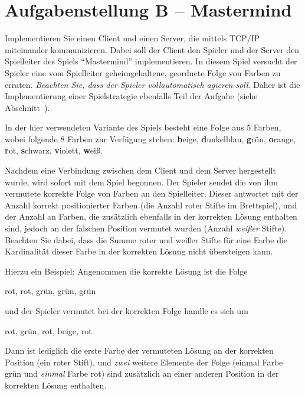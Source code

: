 

\usepackage{bytefield}

\newcommand{\baselinecenterit}[1]{%
  \centering
  \raisebox{0pt}[\heightof{W}][0pt]{\itshape #1}%
}




\section*{Aufgabenstellung B -- Mastermind}\label{sec:aufgabenstellung}
Implementieren Sie einen Client und einen Server, die mittels TCP/IP
miteinander kommunizieren. Dabei soll der Client den Spieler und der Server den
Spielleiter des Spiels ``Mastermind'' implementieren. In diesem Spiel versucht
der Spieler eine vom Spielleiter geheimgehaltene, geordnete Folge von Farben zu
erraten. \emph{Beachten Sie, dass der Spieler vollautomatisch agieren soll}. Daher
ist die Implementierung einer Spielstrategie ebenfalls Teil der Aufgabe
(siehe Abschnitt~).

In der hier verwendeten Variante des Spiels besteht eine Folge aus 5 Farben,
wobei folgende 8 Farben zur Verfügung stehen:
\textbf{b}eige,
\textbf{d}unkelblau,
\textbf{g}rün,
\textbf{o}range,
\textbf{r}ot,
\textbf{s}chwarz,
\textbf{v}iolett,
\textbf{w}eiß.

Nachdem eine Verbindung zwischen dem Client und dem Server hergestellt wurde,
wird sofort mit dem Spiel begonnen. Der Spieler sendet die von ihm vermutete
korrekte Folge von Farben an den Spielleiter. Dieser antwortet mit der Anzahl
korrekt positionierter Farben (die Anzahl roter Stifte im Brettspiel), und der
Anzahl an Farben, die zusätzlich ebenfalls in der korrekten Lösung enthalten
sind, jedoch an der falschen Position vermutet wurden (Anzahl \emph{weißer}
Stifte). Beachten Sie dabei, dass die Summe roter und weißer Stifte für eine
Farbe die Kardinalität dieser Farbe in der korrekten Lösung nicht übersteigen
kann.

Hierzu ein Beispiel: Angenommen die korrekte Lösung ist die Folge
\begin{osuefmtcode}
  rot, rot, grün, grün, grün
\end{osuefmtcode}
und der Spieler vermutet bei der korrekten Folge handle es sich um
\begin{osuefmtcode}
  rot, grün, rot, beige, rot
\end{osuefmtcode}
Dann ist lediglich die erste Farbe der vermuteten Lösung an der korrekten
Position (ein roter Stift), und \emph{zwei} weitere Elemente der Folge (einmal
Farbe grün und \emph{einmal} Farbe rot) sind zusätzlich an einer anderen
Position in der korrekten Lösung enthalten.


